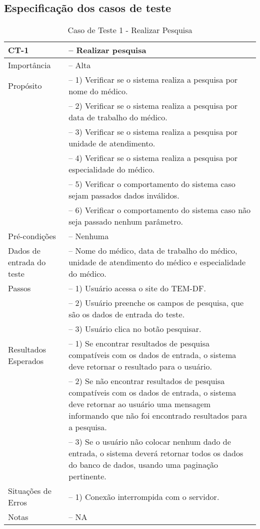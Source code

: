 \begin{anexosenv}

\partanexos

\chapter{Especificação dos casos de teste}
\label{sec:anexo1}

\begin{longtable}{p{4cm}>{-- }p{9cm}}
  \caption{Caso de Teste 1 - Realizar Pesquisa}\label{tab:ct1} \\
  \toprule
  \noindent
  CT-1                      & Realizar pesquisa \\ \midrule
  Importância               & Alta\\ \midrule
  Propósito                 & 1) Verificar se o sistema realiza a pesquisa por nome do médico.\\ 
                            & 2) Verificar se o sistema realiza a pesquisa por data de trabalho do médico.\\
                            & 3) Verificar se o sistema realiza a pesquisa por unidade de atendimento.\\
                            & 4) Verificar se o sistema realiza a pesquisa por especialidade do médico.\\
                            & 5) Verificar o comportamento do sistema caso sejam passados dados inválidos.\\
                            & 6) Verificar o comportamento do sistema caso não seja passado nenhum parâmetro.\\ \midrule
  Pré-condições             & Nenhuma\\ \midrule
  Dados de entrada do teste & Nome do médico, data de trabalho do médico, unidade de atendimento do médico e especialidade do médico.\\ \midrule
  Passos                    & 1) Usuário acessa o site do TEM-DF.\\
  & 2) Usuário preenche os campos de pesquisa, que são os dados de entrada do teste.\\
  & 3) Usuário clica no botão pesquisar.\\ \midrule
  Resultados Esperados      & 1) Se encontrar resultados de pesquisa compatíveis com os dados de entrada, o sistema deve retornar o resultado para o usuário.\\
  & 2) Se não encontrar resultados de pesquisa compatíveis com os dados de entrada, o sistema deve retornar ao usuário uma mensagem informando que não foi encontrado resultados para a pesquisa.\\
  & 3) Se o usuário não colocar nenhum dado de entrada, o sistema deverá retornar todos os dados do banco de dados, usando uma paginação pertinente.\\ \midrule
  Situações de Erros        & 1) Conexão interrompida com o servidor.\\ \midrule
  Notas                     & NA                                     \\ \bottomrule
\end{longtable}


\end{anexosenv}
